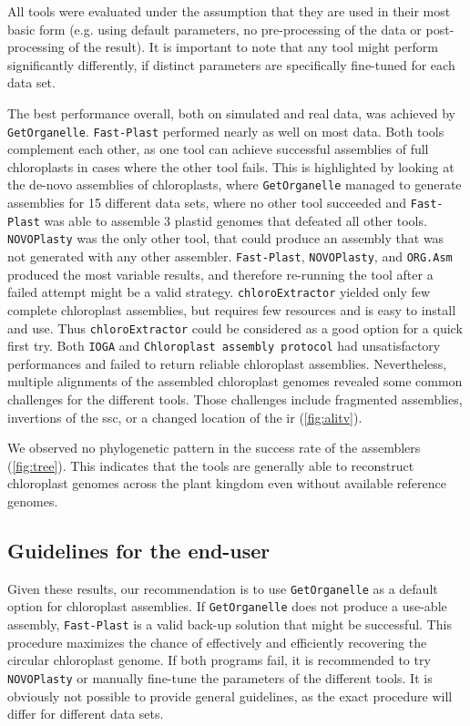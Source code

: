 \documentclass{bmcart}
\newcommand{\todo}[1]{\textcolor{red}{\bfseries(ToDO: #1})}
\newcommand{\formatprogramnames}[1]{\texttt{#1}}
\newcommand{\ce}{\formatprogramnames{chloroExtractor}}
\newcommand{\oa}{\formatprogramnames{ORG.Asm}}
\newcommand{\fp}{\formatprogramnames{Fast-Plast}}
\newcommand{\ioga}{\formatprogramnames{IOGA}}
\newcommand{\np}{\formatprogramnames{NOVOPlasty}}
\newcommand{\go}{\formatprogramnames{GetOrganelle}}
\newcommand{\cassp}{\formatprogramnames{Chloroplast assembly protocol}}
\begin{document}
All tools were evaluated under the assumption that they are used in their most basic form (e.g. using default parameters, no pre-processing of the data or post-processing of the result).
It is important to note that any tool might perform significantly differently, if distinct parameters are specifically fine-tuned for each data set.

The best performance overall, both on simulated and real data, was achieved by \go{}. \fp{} performed nearly as well on most data.
Both tools complement each other, as one tool can achieve successful assemblies of full chloroplasts in cases where the other tool fails. 
This is highlighted by looking at the de-novo assemblies of chloroplasts, where \go{} managed to generate assemblies for 15 different data sets, where no other tool succeeded and \fp{} was able to assemble 3 plastid genomes that defeated all other tools. \np{} was the only other tool, that could produce an assembly that was not generated with any other assembler. 
\fp{}, \np{}, and \oa{} produced the most variable results, and therefore re-running the tool after a failed attempt might be a valid strategy.
\ce{} yielded only few complete chloroplast assemblies, but requires few resources and is easy to install and use. 
Thus \ce{} could be considered as a good option for a quick first try.
Both \ioga{} and \cassp{} had unsatisfactory performances and failed to return reliable chloroplast assemblies.
Nevertheless, multiple alignments of the assembled chloroplast genomes revealed some common challenges for the different tools. 
Those challenges include fragmented assemblies, invertions of the \gls{ssc}, or a changed location of the \gls{ir} (\cref{fig:alitv}).

We observed no phylogenetic pattern in the success rate of the assemblers (\cref{fig:tree}).
This indicates that the tools are generally able to reconstruct chloroplast genomes across the plant kingdom even without available reference genomes.

\subsection*{Guidelines for the end-user}
Given these results, our recommendation is to use \go{} as a default option for chloroplast assemblies. 
If \go{} does not produce a use-able assembly, \fp{} is a valid back-up solution that might be successful. 
This procedure maximizes the chance of effectively and efficiently recovering the circular chloroplast genome.
If both programs fail, it is recommended to try \np{} or manually fine-tune the parameters of the different tools.
It is obviously not possible to provide general guidelines, as the exact procedure will differ for different data sets.
 
\end{document}

